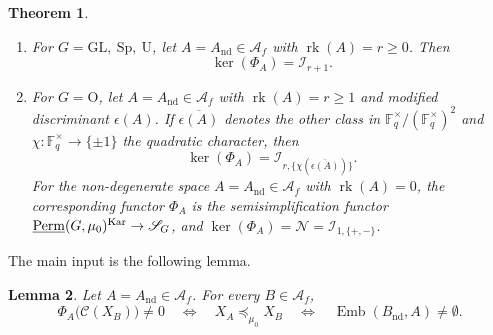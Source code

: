 \documentclass[11pt,a4paper]{amsart}
\theoremstyle{plain}%
\newtheorem{lemma}{Lemma}[subsection]
\newtheorem{theorem}[lemma]{Theorem}
\theoremstyle{definition}
\theoremstyle{remark}
\newcommand{\rk}{{\operatorname{rk}}}
\newcommand{\Perm}{\underline{{\rm Perm}}}
\newcommand{\F}{{\mathbb F}}
\newcommand{\Kar}{\mathrm{Kar}}
\newcommand{\Emb}{\operatorname{Emb}}
\newcommand{\nd}{\mathrm{nd}}
\begin{document}
\begin{theorem}\label{thm:kernels}
\mbox{}

\begin{enumerate}[itemindent=0pt,leftmargin=*,label=\textup{(\alph*)}]
\item For $G=\mathrm{GL,~Sp,~U}$, let $A=A_{\nd}\in \mathcal{A}_f$ with $\rk(A)=r\geq0$.
Then
\[
 \ker(\Phi_{A})=\mathcal I_{r+1}.
\]
\item For $G=\mathrm{O}$, let $A=A_{\nd}\in \mathcal{A}_f$ with $\rk(A)=r\geq1$ and modified discriminant $\epsilon(A)$. If $\overline{\epsilon(A)}$ denotes
the other class in $\F_q^\times/(\F_q^\times)^2$ and $\chi: \F_q^{\times} \to \{\pm 1\}$ the quadratic character, then
\[
 \ker(\Phi_{A})=\mathcal I_{r,\{\chi(\overline{\epsilon(A)})\}}.
\]
For the non-degenerate space $A=A_{\nd}\in \mathcal{A}_f$ with $\rk(A)=0$, the corresponding functor $\Phi_{A}$ is the semisimplification functor $\Perm(G, \mu_0)^{\Kar} \to \mathscr S_{G}$, and $ \ker(\Phi_{A})=\mathcal{N}=\mathcal{I}_{1, \{+, -\}}$.
\end{enumerate}
\end{theorem}

The main input is the following lemma.

\begin{lemma}\label{lem:restriction-detects}
Let $A=A_{\nd}\in \mathcal{A}_f$. For every $B\in \mathcal{A}_f$,
\begin{equation}\label{eq:restriction-detects}
 \Phi_A\bigl(\mathcal{C}(X_B)\bigr)\neq0
 \quad\Longleftrightarrow\quad
 X_A\preceq_{\mu_0}X_B  \quad\Longleftrightarrow\quad \Emb(B_{\nd}, A)\neq \emptyset.
\end{equation}

\end{lemma}
\end{document}
